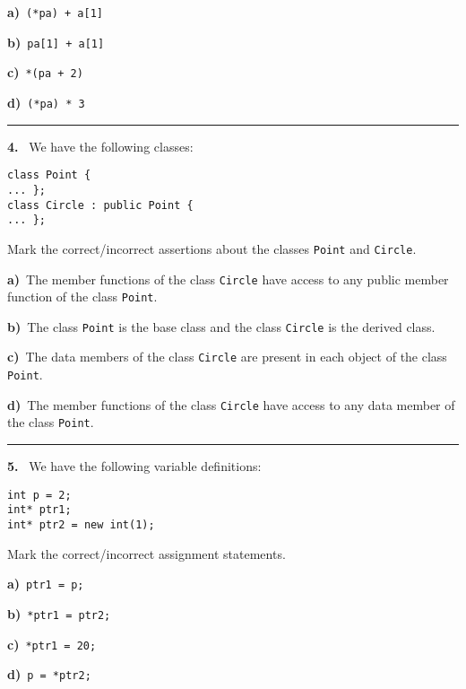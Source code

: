 \begin{multicols}{2}
{\bf a)}\ \verb|(*pa) + a[1]|

{\bf b)}\ \verb|pa[1] + a[1]|

{\bf c)}\ \verb|*(pa + 2)|

{\bf d)}\ \verb|(*pa) * 3|

\par\smallskip\hrule\par\medskip

{\bf 4. }\ We have the following classes:
 \vspace{-3mm}\begin{verbatim}
class Point {
... };
class Circle : public Point {
... };
 \end{verbatim}\vspace{-6mm}
Mark the correct/incorrect assertions about the classes
\verb|Point| and \verb|Circle|.

{\bf a)}\ The member functions of the class \verb|Circle| have access to any public member function of the class \verb|Point|.

{\bf b)}\ The class \verb|Point| is the base class and the class \verb|Circle| is the derived class.

{\bf c)}\ The data members of the class \verb|Circle| are present in each object of the class \verb|Point|.

{\bf d)}\ The member functions of the class \verb|Circle| have access to any data member of the class \verb|Point|.

\par\smallskip\hrule\par\medskip

{\bf 5. }\ We have the following variable definitions:
 \vspace{-3mm}\begin{verbatim}
int p = 2;
int* ptr1;
int* ptr2 = new int(1);
 \end{verbatim}\vspace{-6mm}
Mark the correct/incorrect assignment statements.

{\bf a)}\ \verb|ptr1 = p;|

{\bf b)}\ \verb|*ptr1 = ptr2;|

{\bf c)}\ \verb|*ptr1 = 20;|

{\bf d)}\ \verb|p = *ptr2;|

\end{multicols}


